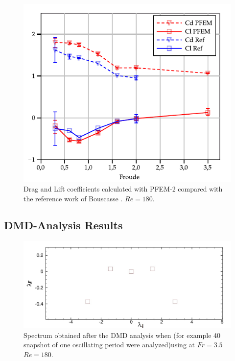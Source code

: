 \begin{figure}[ht]
  \centering
  \includegraphics[width=0.95\columnwidth]{images_10thspheric/CdCl_Re180_hd_0_55.pdf}
  \caption{Drag and Lift coefficients calculated with PFEM-2 compared with the reference work of Bouscasse \cite{Bouscasse14}. $Re=180$.} %
  \label{fg:CdCl}
\end{figure} 

\subsection{DMD-Analysis Results}



\begin{figure}[ht]
  \centering
  \includegraphics[width=0.95\columnwidth]{images_10thspheric/modos2.jpeg}
  \caption{Spectrum obtained after the DMD analysis when (for example 40 snapshot of one oscillating period were analyzed)using at $Fr=3.5$ $Re=180$.} 
  \label{fg:CdCl}
\end{figure} 

